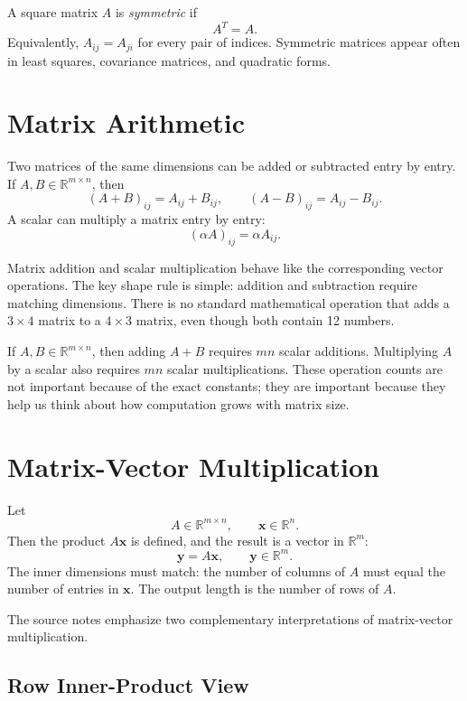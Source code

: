 A square matrix \(A\) is \emph{symmetric} if
\[
    A^T=A.
\]
Equivalently, \(A_{ij}=A_{ji}\) for every pair of indices. Symmetric matrices appear often in least squares, covariance matrices, and quadratic forms.

\section{Matrix Arithmetic}
\label{mf:matrix-arithmetic}

Two matrices of the same dimensions can be added or subtracted entry by entry. If \(A,B\in\mathbb{R}^{m\times n}\), then
\[
    (A+B)_{ij}=A_{ij}+B_{ij},
    \qquad
    (A-B)_{ij}=A_{ij}-B_{ij}.
\]
A scalar can multiply a matrix entry by entry:
\[
    (\alpha A)_{ij}=\alpha A_{ij}.
\]

Matrix addition and scalar multiplication behave like the corresponding vector operations. The key shape rule is simple: addition and subtraction require matching dimensions. There is no standard mathematical operation that adds a \(3\times 4\) matrix to a \(4\times 3\) matrix, even though both contain 12 numbers.

If \(A,B\in\mathbb{R}^{m\times n}\), then adding \(A+B\) requires \(mn\) scalar additions. Multiplying \(A\) by a scalar also requires \(mn\) scalar multiplications. These operation counts are not important because of the exact constants; they are important because they help us think about how computation grows with matrix size.

\section{Matrix-Vector Multiplication}
\label{mf:matrix-vector-multiplication}
\label{mf:linear-transformations}

Let
\[
    A\in\mathbb{R}^{m\times n},
    \qquad
    \mathbf{x}\in\mathbb{R}^n.
\]
Then the product \(A\mathbf{x}\) is defined, and the result is a vector in \(\mathbb{R}^m\):
\[
    \mathbf{y}=A\mathbf{x},
    \qquad
    \mathbf{y}\in\mathbb{R}^m.
\]
The inner dimensions must match: the number of columns of \(A\) must equal the number of entries in \(\mathbf{x}\). The output length is the number of rows of \(A\).

The source notes emphasize two complementary interpretations of matrix-vector multiplication.

\subsection{Row Inner-Product View}
\label{mf:matrix-vector-row-view}

